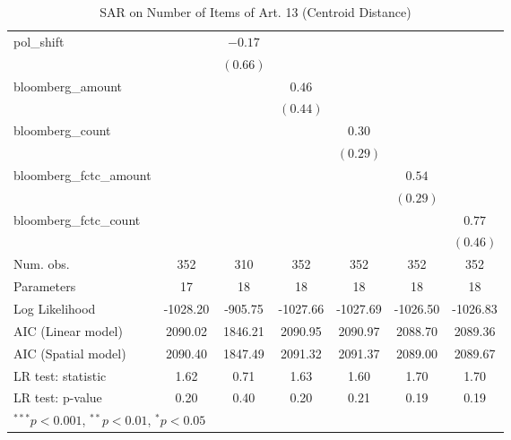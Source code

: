 \begin{table}[!h]
\begin{center}
\begin{tabular}{l c c c c c c }
pol\_shift              &              & $-0.17$      &              &              &              &              \\
                        &              & $(0.66)$     &              &              &              &              \\
bloomberg\_amount       &              &              & $0.46$       &              &              &              \\
                        &              &              & $(0.44)$     &              &              &              \\
bloomberg\_count        &              &              &              & $0.30$       &              &              \\
                        &              &              &              & $(0.29)$     &              &              \\
bloomberg\_fctc\_amount &              &              &              &              & $0.54$       &              \\
                        &              &              &              &              & $(0.29)$     &              \\
bloomberg\_fctc\_count  &              &              &              &              &              & $0.77$       \\
                        &              &              &              &              &              & $(0.46)$     \\
\midrule
Num. obs.               & 352          & 310          & 352          & 352          & 352          & 352          \\
Parameters              & 17           & 18           & 18           & 18           & 18           & 18           \\
Log Likelihood          & -1028.20     & -905.75      & -1027.66     & -1027.69     & -1026.50     & -1026.83     \\
AIC (Linear model)      & 2090.02      & 1846.21      & 2090.95      & 2090.97      & 2088.70      & 2089.36      \\
AIC (Spatial model)     & 2090.40      & 1847.49      & 2091.32      & 2091.37      & 2089.00      & 2089.67      \\
LR test: statistic      & 1.62         & 0.71         & 1.63         & 1.60         & 1.70         & 1.70         \\
LR test: p-value        & 0.20         & 0.40         & 0.20         & 0.21         & 0.19         & 0.19         \\
\bottomrule
\multicolumn{7}{l}{\scriptsize{$^{***}p<0.001$, $^{**}p<0.01$, $^*p<0.05$}}
\end{tabular}
\caption{SAR on Number of Items of Art. 13 (Centroid Distance)}
\label{table:coefficients}
\end{center}
\end{table}
